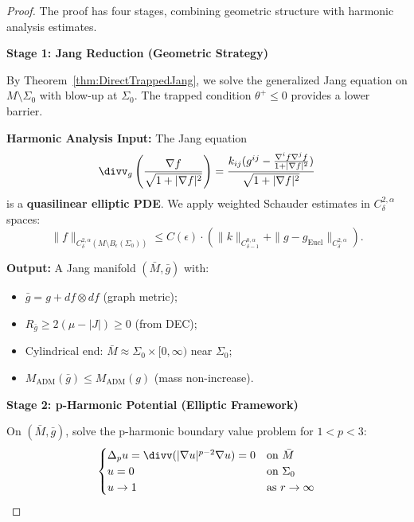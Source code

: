 \begin{proof}
The proof has four stages, combining geometric structure with harmonic analysis estimates.

\textbf{Stage 1: Jang Reduction (Geometric Strategy)}

By Theorem~\ref{thm:DirectTrappedJang}, we solve the generalized Jang equation on $M \setminus \Sigma_0$ with blow-up at $\Sigma_0$. The trapped condition $\theta^+ \leq 0$ provides a lower barrier.

\textbf{Harmonic Analysis Input:} The Jang equation
\begin{equation}
\divv_g\left(\frac{\nabla f}{\sqrt{1 + |\nabla f|^2}}\right) = \frac{k_{ij}(g^{ij} - \frac{\nabla^i f \nabla^j f}{1 + |\nabla f|^2})}{\sqrt{1 + |\nabla f|^2}}
\end{equation}
is a \textbf{quasilinear elliptic PDE}. We apply weighted Schauder estimates in $C^{2,\alpha}_\delta$ spaces:
\begin{equation}
\|f\|_{C^{2,\alpha}_\delta(M \setminus B_\epsilon(\Sigma_0))} \leq C(\epsilon) \cdot \left(\|k\|_{C^{0,\alpha}_{\delta-1}} + \|g - g_{\mathrm{Eucl}}\|_{C^{2,\alpha}_\delta}\right).
\end{equation}

\textbf{Output:} A Jang manifold $(\bar{M}, \bar{g})$ with:
\begin{itemize}
\item $\bar{g} = g + df \otimes df$ (graph metric);
\item $R_{\bar{g}} \geq 2(\mu - |J|) \geq 0$ (from DEC);
\item Cylindrical end: $\bar{M} \approx \Sigma_0 \times [0, \infty)$ near $\Sigma_0$;
\item $M_{\mathrm{ADM}}(\bar{g}) \leq M_{\mathrm{ADM}}(g)$ (mass non-increase).
\end{itemize}

\textbf{Stage 2: p-Harmonic Potential (Elliptic Framework)}

On $(\bar{M}, \bar{g})$, solve the p-harmonic boundary value problem for $1 < p < 3$:
\begin{equation}\label{eq:p-harmonic-BVP}
\begin{cases}
\Delta_p u = \divv(|\nabla u|^{p-2} \nabla u) = 0 & \text{on } \bar{M} \\
u = 0 & \text{on } \Sigma_0 \\
u \to 1 & \text{as } r \to \infty
\end{cases}
\end{equation}


\end{proof}
